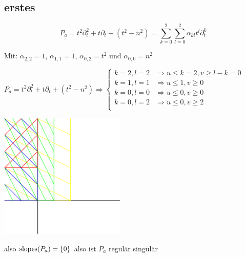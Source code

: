 \subsection{erstes}
\[
  P_a=t^2\partial_t^2+t\partial_t+(t^2-n^2)=\sum_{k=0}^2\sum_{l=0}^2
  \alpha_{kl}t^l\partial_t^k
\]

Mit: $\alpha_{2,2}=1$, $\alpha_{1,1}=1$, $\alpha_{0,2}=t^2$ und
$\alpha_{0,0}=n^2$

$
P_a=t^2\partial_t^2+t\partial_t+(t^2-n^2) \Rightarrow 
\begin{cases}
  k=2,l=2 & \Rightarrow u\leq k=2, v\geq l-k=0\\
  k=1,l=1 & \Rightarrow u\leq 1, v\geq 0\\
  k=0,l=0 & \Rightarrow u\leq 0, v\geq 0\\
  k=0,l=2 & \Rightarrow u\leq 0, v\geq 2\\
\end{cases}
$

\begin{center}
  \includegraphics[width=6cm]{beispiele/img/a.png}
\end{center}
also $\operatorname{slopes}(P_a)=\{0\}$ also ist $P_a$ regulär singulär

